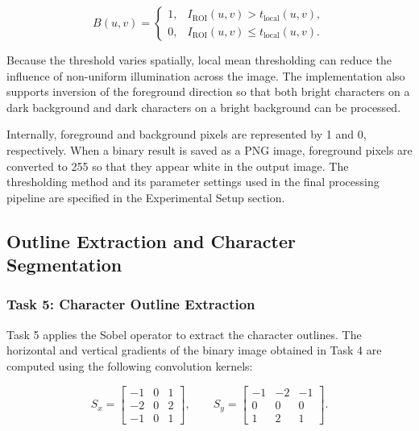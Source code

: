 \documentclass[conference]{IEEEtran}
\begin{document}
\begin{equation}
B(u,v)
=
\begin{cases}
1, & I_{\mathrm{ROI}}(u,v)>t_{\mathrm{local}}(u,v),\\[4pt]
0, & I_{\mathrm{ROI}}(u,v)\leq t_{\mathrm{local}}(u,v).
\end{cases}
\label{eq:local_binarization}
\end{equation}

Because the threshold varies spatially, local mean thresholding can
reduce the influence of non-uniform illumination across the image.
The implementation also supports inversion of the foreground
direction so that both bright characters on a dark background and
dark characters on a bright background can be processed.

Internally, foreground and background pixels are represented by 1 and
0, respectively. When a binary result is saved as a PNG image,
foreground pixels are converted to 255 so that they appear white in
the output image. The thresholding method and its parameter settings
used in the final processing pipeline are specified in the
Experimental Setup section.

\subsection{Outline Extraction and Character Segmentation}

\subsubsection{Task 5: Character Outline Extraction}

Task 5 applies the Sobel operator to extract the character outlines.
The horizontal and vertical gradients of the binary image obtained in
Task 4 are computed using the following convolution kernels:

\begin{equation}
S_x=
\begin{bmatrix}
-1 & 0 & 1\\
-2 & 0 & 2\\
-1 & 0 & 1
\end{bmatrix},
\qquad
S_y=
\begin{bmatrix}
-1 & -2 & -1\\
0 & 0 & 0\\
1 & 2 & 1
\end{bmatrix}.
\label{eq:sobel_kernels}
\end{equation}
\end{document}
